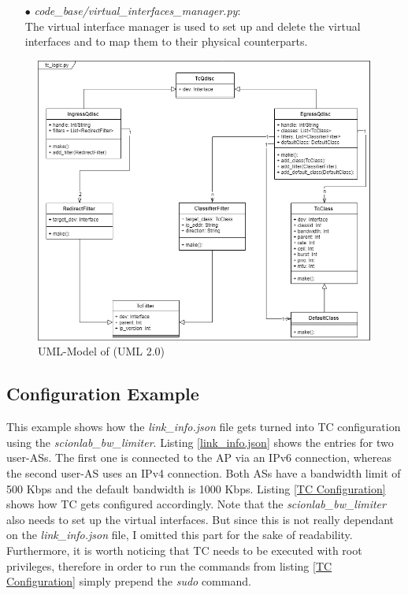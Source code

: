 \begin{enumerate}
\item[$\bullet$]\textit{code\_base/virtual\_interfaces\_manager.py}:
\\
The virtual interface manager is used to set up and delete the virtual interfaces and to map them to their physical counterparts.

\end{enumerate}

\begin{figure}[h]
	\centering
  	\includegraphics[width=\textwidth]{img/tc_logic_uml.png}
    \caption{UML-Model of  (UML 2.0)}
    \label{tc logic uml}
\end{figure}

\newpage
\textit{ }
\newpage
\subsection{Configuration Example}

This example shows how the \textit{link\_info.json} file gets turned into \acs{TC} configuration using the \textit{scionlab\_bw\_limiter}. Listing \ref{link_info.json} shows the entries for two user-\acsp{AS}.  The first one is connected to the \acs{AP} via an \acs{IP}v6 connection, whereas the second user-\acs{AS} uses an \acs{IP}v4 connection. Both \acsp{AS} have a bandwidth limit of 500 Kbps and the default bandwidth is 1000 Kbps. Listing \ref{TC Configuration} shows how \acs{TC} gets configured accordingly. Note that the \textit{scionlab\_bw\_limiter} also needs to set up the virtual interfaces. But since this is not really dependant on the \textit{link\_info.json} file, I omitted this part for the sake of readability. Furthermore, it is worth noticing that \acs{TC} needs to be executed with root privileges, therefore in order to run the commands from listing \ref{TC Configuration} simply prepend the \textit{sudo} command.

